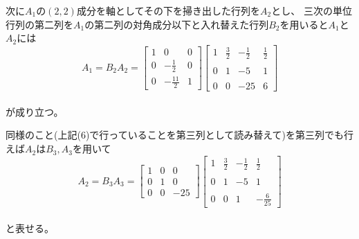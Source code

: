 \documentclass[a4paper,11pt]{jsarticle}
\begin{document}
次に$A_1$の$(2,2)$成分を軸としてその下を掃き出した行列を$A_2$とし、
三次の単位行列の第二列を$A_1$の第二列の対角成分以下と入れ替えた行列$B_2$を用いると$A_1$と$A_2$には
\begin{equation}
    A_1 = B_2 A_2
    =
    \begin{bmatrix}
        1 & 0 & 0 \\ 
        0 & \displaystyle -\frac{1}{2} & 0 \\ 
        0 & \displaystyle -\frac{11}{2} & 1
    \end{bmatrix}
    \begin{bmatrix}
        1 & \displaystyle \frac{3}{2} & 
        \displaystyle -\frac{1}{2} & \displaystyle \frac{1}{2} \\ \\
        0 & 1 & -5 & 1 \\ \\
        0 & 0 & -25 & 6
    \end{bmatrix}
\end{equation}
\\
が成り立つ。

同様のこと(上記(6)で行っていることを第三列として読み替えて)を第三列でも行えば$A_2$は$B_3,A_3$を用いて
\begin{equation}
    A_2 = B_3 A_3
    =
    \begin{bmatrix}
        1 & 0 & 0\\
        0 & 1 & 0\\
        0 & 0 & -25
    \end{bmatrix}
    \begin{bmatrix}
        1 & \displaystyle \frac{3}{2} & 
        \displaystyle -\frac{1}{2} & \displaystyle \frac{1}{2} \\ \\
        0 & 1 & -5 & 1 \\ \\
        0 & 0 & 1 & \displaystyle -\frac{6}{25}
    \end{bmatrix}
\end{equation}
\\
と表せる。
\end{document}

